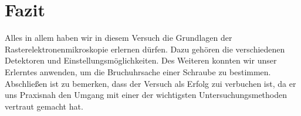 
\chapter{Fazit}
\label{chap:fazit}

Alles in allem haben wir in diesem Versuch die Grundlagen der Rasterelektronenmikroskopie erlernen dürfen. Dazu gehören die verschiedenen Detektoren und Einstellungsmöglichkeiten.
Des Weiteren konnten wir unser Erlerntes anwenden, um die Bruchuhrsache einer Schraube zu bestimmen.\\

Abschließen ist zu bemerken, dass der Versuch als Erfolg zui verbuchen ist, da er uns Praxisnah den Umgang mit einer der wichtigsten Untersuchungsmethoden vertraut gemacht hat.